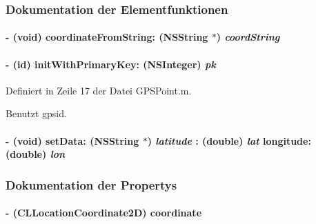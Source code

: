 \subsubsection{Dokumentation der Elementfunktionen}
\hypertarget{interface_g_p_s_point_a2d74fe2063a4f68b5d4ea1d9eed77ae0}{
\paragraph[{coordinateFromString:}]{\setlength{\rightskip}{0pt plus 5cm}-\/ (void) coordinateFromString: (NSString $\ast$) {\em coordString}}\hfill}
\label{interface_g_p_s_point_a2d74fe2063a4f68b5d4ea1d9eed77ae0}
\hypertarget{interface_g_p_s_point_a8c6767117b9803d4f1ac4a4b11ec4b0d}{
\paragraph[{initWithPrimaryKey:}]{\setlength{\rightskip}{0pt plus 5cm}-\/ (id) initWithPrimaryKey: (NSInteger) {\em pk}}\hfill}
\label{interface_g_p_s_point_a8c6767117b9803d4f1ac4a4b11ec4b0d}


Definiert in Zeile 17 der Datei GPSPoint.m.

Benutzt gpsid.\hypertarget{interface_g_p_s_point_a22ce3b0053229f96c6bf029ddeaaa504}{
\paragraph[{setData::longitude:}]{\setlength{\rightskip}{0pt plus 5cm}-\/ (void) setData: (NSString $\ast$) {\em latitude}\/ : (double) {\em lat}\/ longitude: (double) {\em lon}}\hfill}
\label{interface_g_p_s_point_a22ce3b0053229f96c6bf029ddeaaa504}


\subsubsection{Dokumentation der Propertys}
\hypertarget{interface_g_p_s_point_ac1135721ea8a2458bd7e6bb05a4f2bce}{
\paragraph[{coordinate}]{\setlength{\rightskip}{0pt plus 5cm}-\/ (CLLocationCoordinate2D) coordinate}\hfill}
\label{interface_g_p_s_point_ac1135721ea8a2458bd7e6bb05a4f2bce}


